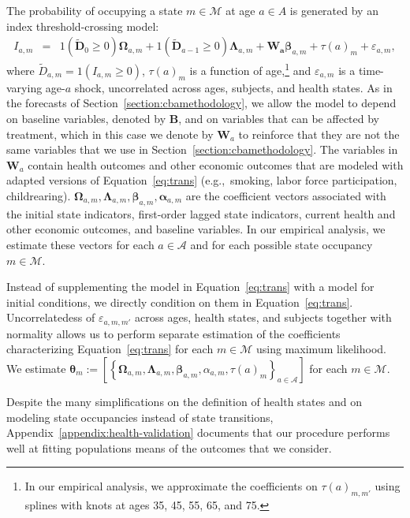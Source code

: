 The probability of occupying a state $m \in \mathcal{M}$ at age $a \in{A}$ is generated by an index threshold-crossing model:
\begin{eqnarray}
I_{a,m} &=&  \bm{\mathit{1}} \left( \tilde{\bm{D}}_{0} \geq 0 \right) \bm{\Omega}_{a,m} + \bm{\mathit{1}} \left( \tilde{\bm{D}}_{a-1} \geq 0\right) \bm{\Lambda}_{a,m} + \bm{W_a} \bm{\beta}_{a,m} + \tau \left( a \right)_{m} + \varepsilon_{a,m}, \label{eq:trans}
\end{eqnarray}
where $\tilde{D}_{a,m} = \bm{\mathit{1}}  \left( I_{a,m} \geq 0 \right)$, $\tau \left( a \right)_{m}$ is a function of age,\footnote{In our empirical analysis, we approximate the coefficients on $\tau \left( a \right)_{m,m'}$ using splines with knots at ages 35, 45, 55, 65, and 75.} and $\varepsilon_{a,m}$ is a time-varying age-$a$ shock, uncorrelated across ages, subjects, and health states. As in the forecasts of Section~\ref{section:cbamethodology}, we allow the model to depend on baseline variables, denoted by $\bm{B}$, and on variables that can be affected by treatment, which in this case we denote by $\bm{W}_a$ to reinforce that they are not the same variables that we use in Section~\ref{section:cbamethodology}. The variables in $\bm{W}_a$ contain health outcomes and other economic outcomes that are modeled with adapted versions of Equation~\eqref{eq:trans} (e.g.,\ smoking, labor force participation, childrearing). $ \bm{\Omega}_{a,m},  \bm{\Lambda}_{a,m}, \bm{\beta}_{a,m},  \bm{\alpha}_{a,m}$ are the coefficient vectors associated with the initial state indicators, first-order lagged state indicators, current health and other economic outcomes, and baseline variables. In our empirical analysis, we estimate these vectors for each $a \in \mathcal{A}$ and for each possible state occupancy $m \in \mathcal{M}$.

Instead of supplementing the model in Equation~\eqref{eq:trans} with a model for initial conditions, we directly condition on them in Equation~\eqref{eq:trans}. Uncorrelatedess of $\varepsilon_{a,m,m'}$ across ages, health states, and subjects together with normality allows us to perform separate estimation of the coefficients characterizing Equation~\eqref{eq:trans} for each $m \in \mathcal{M}$ using maximum likelihood. We estimate $\bm{\theta}_m := \left[ \left\{  \bm{\Omega}_{a,m}, \bm{\Lambda}_{a,m}, \bm{\beta}_{a,m}, \alpha_{a,m}, \tau \left( a \right) _{m}  \right\}_{a \in \mathcal{A}} \right]$ for each $m \in \mathcal{M}$.

Despite the many simplifications on the definition of health states and on modeling state occupancies instead of state transitions, Appendix~\ref{appendix:health-validation} documents that our procedure performs well at fitting populations means of the outcomes that we consider.

